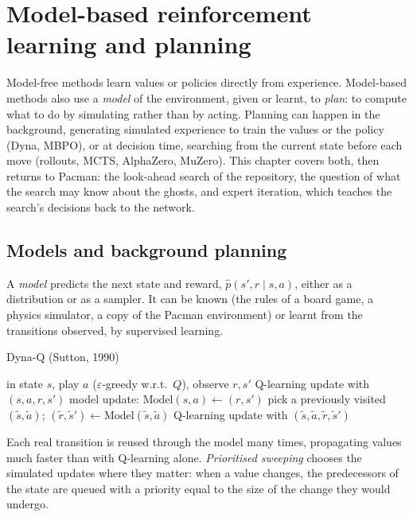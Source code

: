 \chapter{Model-based reinforcement learning and planning}
\label{ch:model-based}
\label{ch:search}

Model-free methods learn values or policies directly from experience.
Model-based methods also use a \emph{model} of the environment, given or
learnt, to \emph{plan}: to compute what to do by simulating rather than by
acting. Planning can happen in the background, generating simulated
experience to train the values or the policy (Dyna, MBPO), or at decision
time, searching from the current state before each move (rollouts, MCTS,
AlphaZero, MuZero). This chapter covers both, then returns to Pacman: the
look-ahead search of the repository, the question of what the search may
know about the ghosts, and expert iteration, which teaches the search's
decisions back to the network.

\section{Models and background planning}

A \emph{model} predicts the next state and reward, $\hat p(s', r \mid s,
a)$, either as a distribution or as a sampler. It can be known (the rules
of a board game, a physics simulator, a copy of the Pacman environment) or
learnt from the transitions observed, by supervised learning.

\begin{algobox}{Dyna-Q (Sutton, 1990)}
  \begin{algorithmic}[1]
      \State in state $s$, play $a$ ($\varepsilon$-greedy w.r.t.\ $Q$),
        observe $r, s'$
      \State Q-learning update with $(s, a, r, s')$
      \State model update: $\mathrm{Model}(s, a) \gets (r, s')$
        \State pick a previously visited $(\tilde s, \tilde a)$;
          $(\tilde r, \tilde s') \gets \mathrm{Model}(\tilde s, \tilde a)$
        \State Q-learning update with $(\tilde s, \tilde a, \tilde r,
          \tilde s')$
      \EndFor
    \EndFor
  \end{algorithmic}
\end{algobox}

Each real transition is reused through the model many times, propagating
values much faster than with Q-learning alone. \emph{Prioritised sweeping}
chooses the simulated updates where they matter: when a value changes, the
predecessors of the state are queued with a priority equal to the size of
the change they would undergo.

